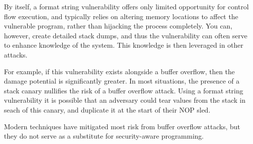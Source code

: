 
By itself, a format string vulnerability offers only limited opportunity for control flow execution, and typically
relies on altering memory locations to affect the vulnerable program, rather than hijacking the process completely. You
can, however, create detailed stack dumps, and thus the vulnerability can often serve to enhance knowledge of the
system. This knowledge is then leveraged in other attacks.


For example, if this vulnerability exists alongside a buffer overflow, then the damage potential is significantly
greater. In most situations, the presence of a stack canary nullifies the risk of a buffer overflow attack. Using a
format string vulnerability it is possible that an adversary could tear values from the stack in seach of this canary,
and duplicate it at the start of their NOP sled. 

Modern techniques have mitigated most risk from buffer overflow attacks, but they do not serve as a substitute for
security-aware programming.
